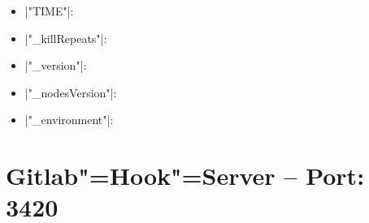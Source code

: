 \documentclass[%
fontsize=11pt
,paper=a4
,twoside
,headings=normal
,numbers=endperiod
,pagesize
]{scrartcl}
\begin{document}
\begin{description}
\begin{itemize}
    \item |"TIME"|: \par

    \item |"_killRepeats"|: \par

    \item |"_version"|: \par

    \item |"_nodesVersion"|: \par

    \item |"_environment"|: \par

  \end{itemize}

\end{description}

\section{Gitlab"=Hook"=Server -- Port: 3420}
\end{document}
